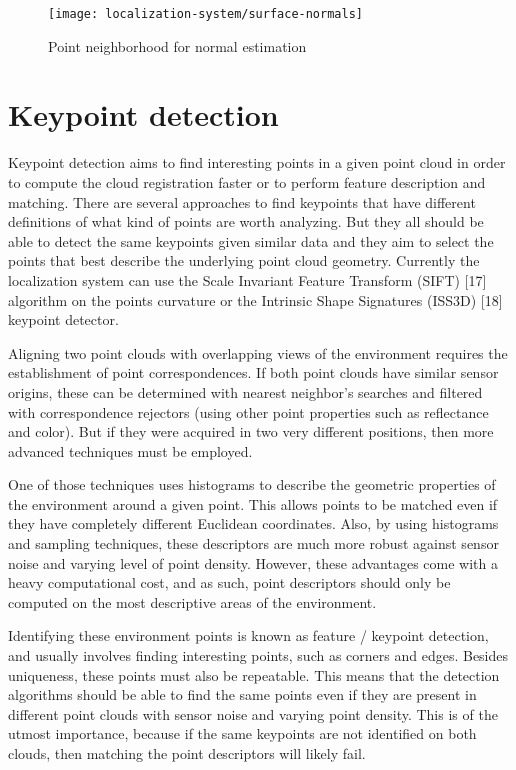 \begin{figure}[H]
	\centering
	\texttt{[image: localization-system/surface-normals]}
	\caption[Point neighborhood for normal estimation]{Point neighborhood for normal estimation \cite{Rusu2010a}}
	\label{fig:localization_system_surface-normals}
\end{figure}



\section{Keypoint detection}

Keypoint detection aims to find interesting points in a given point cloud in order to compute the cloud registration faster or to perform feature description and matching. There are several approaches to find keypoints that have different definitions of what kind of points are worth analyzing. But they all should be able to detect the same keypoints given similar data and they aim to select the points that best describe the underlying point cloud geometry. Currently the localization system can use the Scale Invariant Feature Transform (SIFT) [17] algorithm on the points curvature or the Intrinsic Shape Signatures (ISS3D) [18] keypoint detector.


Aligning two point clouds with overlapping views of the environment requires the establishment of point correspondences. If both point clouds have similar sensor origins, these can be determined with nearest neighbor's searches and filtered with correspondence rejectors (using other point properties such as reflectance and color). But if they were acquired in two very different positions, then more advanced techniques must be employed.

One of those techniques uses histograms to describe the geometric properties of the environment around a given point. This allows points to be matched even if they have completely different Euclidean coordinates. Also, by using histograms and sampling techniques, these descriptors are much more robust against sensor noise and varying level of point density. However, these advantages come with a heavy computational cost, and as such, point descriptors should only be computed on the most descriptive areas of the environment.

Identifying these environment points is known as feature / keypoint detection, and usually involves finding interesting points, such as corners and edges. Besides uniqueness, these points must also be repeatable. This means that the detection algorithms should be able to find the same points even if they are present in different point clouds with sensor noise and varying point density. This is of the utmost importance, because if the same keypoints are not identified on both clouds, then matching the point descriptors will likely fail.

